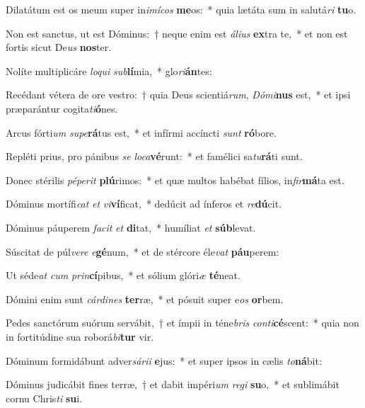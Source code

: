 \item Dilatátum est os meum super in\textit{i}\textit{mí}\textit{cos} \textbf{me}os:~* quia lætáta sum in salutá\textit{ri} \textbf{tu}o.
\item Non est sanctus, ut est Dóminus:~† neque enim est \textit{á}\textit{li}\textit{us} \textbf{ex}tra te,~* et non est fortis sicut De\textit{us} \textbf{nos}ter.
\item Nolíte multiplicáre \textit{lo}\textit{qui} \textit{sub}\textbf{lí}mia,~* glo\textit{ri}\textbf{án}tes:
\item Recédant vétera de ore vestro:~† quia Deus scientiá\textit{rum}, \textit{Dó}\textit{mi}\textbf{nus} est,~* et ipsi præparántur cogita\textit{ti}\textbf{ó}nes.
\item Arcus fórti\textit{um} \textit{su}\textit{pe}\textbf{rá}tus est,~* et infírmi accíncti \textit{sunt} \textbf{ró}bore.
\item Repléti prius, pro pánibus \textit{se} \textit{lo}\textit{ca}\textbf{vé}runt:~* et famélici sa\textit{tu}\textbf{rá}ti sunt.
\item Donec stérilis \textit{pé}\textit{pe}\textit{rit} \textbf{plú}rimos:~* et quæ multos habébat fílios, in\textit{fir}\textbf{má}ta est.
\item Dóminus mortífi\textit{cat} \textit{et} \textit{vi}\textbf{ví}ficat,~* dedúcit ad ínferos et \textit{re}\textbf{dú}cit.
\item Dóminus páuperem \textit{fa}\textit{cit} \textit{et} \textbf{di}tat,~* humíliat \textit{et} \textbf{súb}levat.
\item Súscitat de púl\textit{ve}\textit{re} \textit{e}\textbf{gé}num,~* et de stércore éle\textit{vat} \textbf{páu}perem:
\item Ut séde\textit{at} \textit{cum} \textit{prin}\textbf{cí}pibus,~* et sólium glóri\textit{æ} \textbf{té}neat.
\item Dómini enim sunt \textit{cár}\textit{di}\textit{nes} \textbf{ter}ræ,~* et pósuit super e\textit{os} \textbf{or}bem.
\item Pedes sanctórum suórum servábit,~† et ímpii in téne\textit{bris} \textit{con}\textit{ti}\textbf{cé}scent:~* quia non in fortitúdine sua roborá\textit{bi}\textbf{tur} vir.
\item Dóminum formidábunt adver\textit{sá}\textit{ri}\textit{i} \textbf{e}jus:~* et super ipsos in cælis \textit{to}\textbf{ná}bit:
\item Dóminus judicábit fines terræ,~† et dabit impéri\textit{um} \textit{re}\textit{gi} \textbf{su}o,~* et sublimábit cornu Chris\textit{ti} \textbf{su}i.
